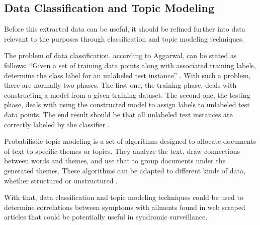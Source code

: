 \subsection{Data Classification and Topic Modeling}
Before this extracted data can be useful, it should be refined further into data relevant to the purposes through classification and topic modeling techniques.

The problem of data classification, according to Aggarwal, can be stated as follows: ``Given a set of training data points along with associated training labels, determine the class label for an unlabeled test instance'' \cite{aggarwal2014data}. With such a problem, there are normally two phases. The first one, the training phase, deals with constructing a model from a given training dataset. The second one, the testing phase, deals with using the constructed model to assign labels to unlabeled test data points. The end result should be that all unlabeled test instances are correctly labeled by the classifier \cite{aggarwal2014data}.

Probabilistic topic modeling is a set of algorithms designed to allocate documents of text to specific themes or topics. They analyze the text, draw connections between words and themes, and use that to group documents under the generated themes. These algorithms can be adapted to different kinds of data, whether structured or unstructured \cite{blei2012probabilistic}.

With that, data classification and topic modeling techniques could be used to determine correlations between symptoms with ailments \cite{paul2012model} found in web scraped articles that could be potentially useful in syndromic surveillance. 